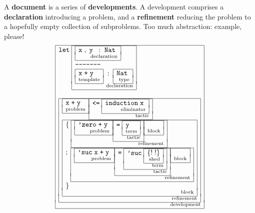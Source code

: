 \documentclass{article}
\begin{document}
A \textbf{document} is a series of \textbf{developments}. A
development comprises a \textbf{declaration} introducing a problem,
and a \textbf{refinement} reducing the problem to a hopefully
empty collection of subproblems. Too much abstraction: example, please!
\newcommand{\capbox}[2]{\raisebox{0.12in}{\begin{array}[t]{|l|}\hline
      #1 \vspace*{-0.05in}\\
    \hfill\mbox{\scriptsize{#2}} \\ \hline\end{array}}}
\newcommand{\Ts}[1]{\texttt{#1}\;}
\newcommand{\co}{\;:\;}
\newcommand{\sco}{;\;\;}
\newcommand{\cm}{,\;}
\[
\capbox{
  \Ts{let}
    \capbox{
      \capbox{\Ts{x} \cm \Ts{y}\co \Ts{Nat}}{declaration}\\
      \Ts{--------------}\\
      \capbox{\Ts{x} \Ts{+} \Ts{y}}{template} \co \capbox{\Ts{Nat}}{type}
      }
      {declaration}\\ \\
  \capbox{
     \capbox{\Ts{x}\Ts{+}\Ts{y}}{problem}
       \capbox{\Ts{<=}\capbox{\Ts{induction}\Ts{x}}{eliminator}}{tactic}\\
     \capbox{
      \{\;\capbox{\capbox{\Ts{'zero}\Ts{+}\Ts{y}}{problem}
                  \capbox{\Ts{=} \capbox{\Ts{y}}{term}}{tactic}
                  \capbox{}{block}
          }{refinement}\\
      ;\;\capbox{\capbox{\Ts{'suc}\Ts{x}\Ts{+}\Ts{y}}{problem}
                 \capbox{\Ts{=} \capbox{\Ts{'suc}
                   \capbox{\{!\;!\}}{shed}}{term}}{tactic}
                  \capbox{}{block}
         }{refinement}\\
      \}
      }{block}
    }
    {refinement}}
    {development}
\]
\end{document}
